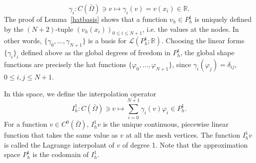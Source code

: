 \documentclass{article}
\begin{document}
$$ \gamma_i: C(\bar{\Omega}) \ni v \mapsto \gamma_i(v) = v(x_i) \in \mathbb{R}.$$
The proof of Lemma~\ref{hatbasis} shows that a function $v_h \in P_h^1$ is uniquely defined by the $(N+2)$-tuple $(v_h(x_i))_{0 \le i \le N+1}$, i.e. the values at the nodes. In other words, $\{\gamma_0, \dots, \gamma_{N+1}\}$ is a basis for $\mathcal{L}(P_h^1; \mathbb{R})$. Choosing the linear forms $\{\gamma_i\}_i$ defined above as the global degrees of freedom in $P_h^1$, the global shape functions are precisely the hat functions $\{\varphi_0, \dots, \varphi_{N+1}\}$, since $\gamma_i(\varphi_j) = \delta_{ij}$, $0 \le i,j \le N+1$.


In this space, we define the interpolation operator
$$ I_h^1: C(\bar{\Omega}) \ni v \mapsto \sum_{i=0}^{N+1} \gamma_i(v) \varphi_i \in P_h^1.$$
For a function $v \in C^0(\bar{\Omega})$, $I_h^1 v$ is the unique continuous, piecewise linear function that takes the same value as $v$ at all the mesh vertices. The function $I_h^1 v$ is called the Lagrange interpolant of $v$ of degree 1. Note that the approximation space $P_h^1$ is the codomain of $I_h^1$. 
\end{document}
